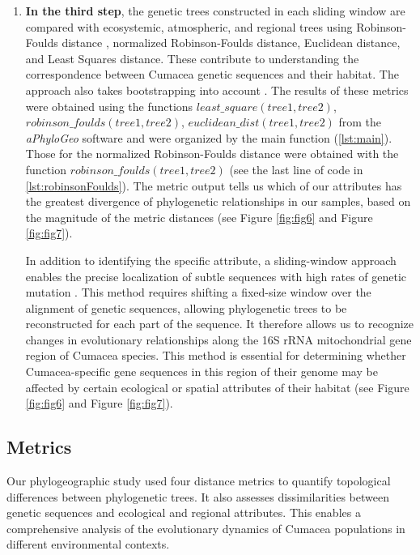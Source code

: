 {\begin{enumerate}
\item \textbf{In the third step}, the genetic trees constructed in each sliding window are compared with ecosystemic, atmospheric, and regional trees using Robinson-Foulds distance \citep{robinson_comparison_1981}, normalized Robinson-Foulds distance, Euclidean distance, and Least Squares distance. These contribute to understanding the correspondence between Cumacea genetic sequences and their habitat. The approach also takes bootstrapping into account \citep{koshkarov_phylogeography_2022}. The results of these metrics were obtained using the functions $least\_square(tree1, tree2)$, $robinson\_foulds(tree1, tree2)$, $euclidean\_dist(tree1, tree2)$ from the \textit{aPhyloGeo} software and were organized by the main function (\autoref{lst:main}). Those for the normalized Robinson-Foulds distance were obtained with the function $robinson\_foulds(tree1, tree2)$ (see the last line of code in \autoref{lst:robinsonFoulds}). The metric output tells us which of our attributes has the greatest divergence of phylogenetic relationships in our samples, based on the magnitude of the metric distances (see Figure \ref{fig:fig6} and Figure \ref{fig:fig7}). 

In addition to identifying the specific attribute, a sliding-window approach enables the precise localization of subtle sequences with high rates of genetic mutation \citep{koshkarov_phylogeography_2022}. This method requires shifting a fixed-size window over the alignment of genetic sequences, allowing phylogenetic trees to be reconstructed for each part of the sequence. It therefore allows us to recognize changes in evolutionary relationships along the 16S rRNA mitochondrial gene region of Cumacea species. This method is essential for determining whether Cumacea-specific gene sequences in this region of their genome may be affected by certain ecological or spatial attributes of their habitat (see Figure \ref{fig:fig6} and Figure \ref{fig:fig7}).
\end{enumerate}

\subsection{Metrics}\label{metrics}
Our phylogeographic study used four distance metrics to quantify topological differences between phylogenetic trees. It also assesses dissimilarities between genetic sequences and ecological and regional attributes. This enables a comprehensive analysis of the evolutionary dynamics of Cumacea populations in different environmental contexts. 

}
